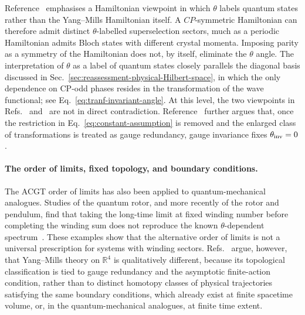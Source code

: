 \documentclass[review]{elsarticle}
\numberwithin{equation}{section}
\numberwithin{table}{section}
\numberwithin{figure}{section}
\begin{document}
Reference~\cite{Kaplan:2025bgy} emphasises a Hamiltonian viewpoint in which $\theta$ labels quantum states rather than the Yang--Mills Hamiltonian itself. A $CP$-symmetric Hamiltonian can therefore admit distinct $\theta$-labelled superselection sectors, much as a periodic Hamiltonian admits Bloch states with different crystal momenta. Imposing parity as a symmetry of the Hamiltonian does not, by itself, eliminate the $\theta$ angle. The interpretation of $\theta$ as a label of quantum states closely parallels the diagonal basis discussed in Sec.~\ref{sec:reassessment-physical-Hilbert-space}, in which the only dependence on CP-odd
phases resides in the transformation of the wave functional; see Eq.~\eqref{eq:tranf-invariant-angle}. At this level, the two viewpoints in Refs.~\cite{Kaplan:2025bgy} and~\cite{Ai:2024vfa} are not in direct contradiction. Reference~\cite{Ai:2024vfa} further argues that, once the restriction in Eq.~\eqref{eq:constant-assumption} is removed and the enlarged class of transformations is treated as gauge redundancy, gauge invariance fixes $\theta_{\rm inv}=0$.



\paragraph{The order of limits, fixed topology, and boundary conditions.}

The ACGT order of limits has also been applied to quantum-mechanical analogues. Studies of the quantum rotor, and more recently of the rotor and pendulum, find that taking the long-time limit at fixed winding number before completing the winding sum does not reproduce the known $\theta$-dependent spectrum~\cite{Albandea:2024fui,Aghaie:2026pkf}. These examples show that the alternative order of limits is not a universal prescription for systems with winding sectors. Refs.~\cite{Ai:2020ptm,Ai:2024cnp} argue, however, that Yang--Mills theory on $\mathbb R^4$ is qualitatively different, because its topological classification is tied to gauge redundancy and the asymptotic finite-action condition, rather than to distinct homotopy classes of physical trajectories satisfying the same boundary conditions, which already exist at finite spacetime volume, or, in the quantum-mechanical analogues, at finite time extent.
\end{document}
